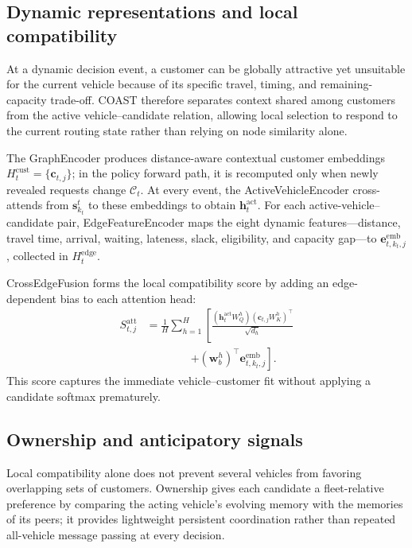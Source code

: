 \documentclass[letterpaper]{article}
\begin{document}
\subsection{Dynamic representations and local compatibility}

At a dynamic decision event, a customer can be globally attractive yet unsuitable for the current vehicle because of its specific travel, timing, and remaining-capacity trade-off. COAST therefore separates context shared among customers from the active vehicle--candidate relation, allowing local selection to respond to the current routing state rather than relying on node similarity alone.

The GraphEncoder produces distance-aware contextual customer embeddings $H_t^{\mathrm{cust}}=\{\mathbf c_{t,j}\}$; in the policy forward path, it is recomputed only when newly revealed requests change $\mathcal C_t$. At every event, the ActiveVehicleEncoder cross-attends from $\mathbf s_{k_t}^t$ to these embeddings to obtain $\mathbf h_t^{\mathrm{act}}$. For each active-vehicle--candidate pair, EdgeFeatureEncoder maps the eight dynamic features---distance, travel time, arrival, waiting, lateness, slack, eligibility, and capacity gap---to $\mathbf e_{t,k_t,j}^{\mathrm{emb}}$, collected in $H_t^{\mathrm{edge}}$.

CrossEdgeFusion forms the local compatibility score by adding an edge-dependent bias to each attention head:
\[
\begin{aligned}
S_{t,j}^{\mathrm{att}}
&=\frac{1}{H}\sum_{h=1}^{H}\left[
\frac{(\mathbf h_t^{\mathrm{act}}W_Q^h)(\mathbf c_{t,j}W_K^h)^\top}{\sqrt{d_h}}\right.\\[-2pt]
&\hspace{48pt}\left.+(\mathbf w_b^h)^\top\mathbf e_{t,k_t,j}^{\mathrm{emb}}\right].
\end{aligned}
\]
This score captures the immediate vehicle--customer fit without applying a candidate softmax prematurely.

\subsection{Ownership and anticipatory signals}

Local compatibility alone does not prevent several vehicles from favoring overlapping sets of customers. Ownership gives each candidate a fleet-relative preference by comparing the acting vehicle's evolving memory with the memories of its peers; it provides lightweight persistent coordination rather than repeated all-vehicle message passing at every decision.
\end{document}
